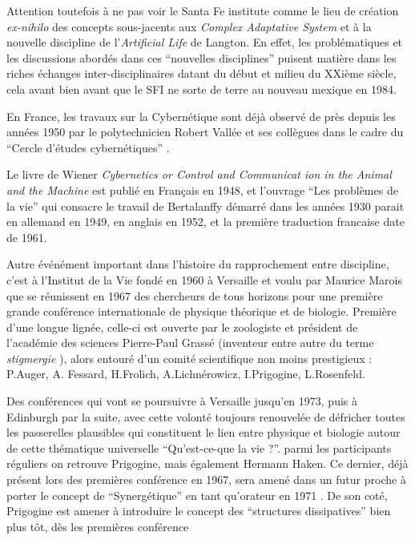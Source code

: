Attention toutefois à ne pas voir le Santa Fe institute comme le lieu de création \textit{ex-nihilo} des concepts sous-jacents aux \textit{Complex Adaptative System} et à la nouvelle discipline de l'\textit{Artificial Life} de Langton. En effet, les problématiques et les discussions abordés dans ces \enquote{nouvelles disciplines} puisent matière dans les riches échanges inter-disciplinaires datant du début et milieu du XXième siècle, cela avant bien avant que le SFI ne sorte de terre au nouveau mexique en 1984.





En France, les travaux sur la Cybernétique sont déjà observé de près depuis les années 1950 par le polytechnicien Robert Vallée et ses collègues dans le cadre du \enquote{Cercle d’études cybernétiques} \autocite{Bricage1990}.

Le livre de Wiener \textit{Cybernetics or Control and Communicat
ion in the Animal and the Machine} est publié en Français en 1948, et l'ouvrage \enquote{Les problèmes de la vie}  qui consacre le travail de Bertalanffy démarré dans les années 1930 parait en allemand en 1949, en anglais en 1952, et la première traduction francaise date de 1961. \autocite{Vallee2005}

Autre événément important dans l'histoire du rapprochement entre discipline, c'est à l'Institut de la Vie fondé en 1960 à Versaille et voulu par Maurice Marois que se réunissent en 1967 des chercheurs de tous horizons pour une première grande conférence internationale de physique théorique et de biologie. Première d'une longue lignée, celle-ci est ouverte par le zoologiste et président de l'académie des sciences Pierre-Paul Grassé (inventeur entre autre du terme \textit{stigmergie} \autocite{Theraulaz1999}), alors entouré d'un comité scientifique non moins prestigieux : P.Auger, A. Fessard, H.Frolich, A.Lichnérowicz, I.Prigogine, L.Rosenfeld. \autocites{Marois1969,Marois1971}

Des conférences qui vont se poursuivre à Versaille jusqu'en 1973, puis à Edinburgh par la suite, avec cette volonté toujours renouvelée de défricher toutes les passerelles plausibles qui constituent le lien entre physique et biologie autour de cette thématique universelle \enquote{Qu'est-ce-que la vie ?}. parmi les participants réguliers on retrouve Prigogine, mais également Hermann Haken. Ce dernier, déjà présent lors des premières conférence en 1967, sera amené dans un futur proche à porter le concept de \enquote{Synergétique} en tant qu'orateur en 1971 \autocite{Kroger2012, Kroger2015}. De son coté,  Prigogine est amener à introduire le concept des \enquote{structures dissipatives} bien plus tôt, dès les premières conférence \autocite[60]{Stengers1985}

